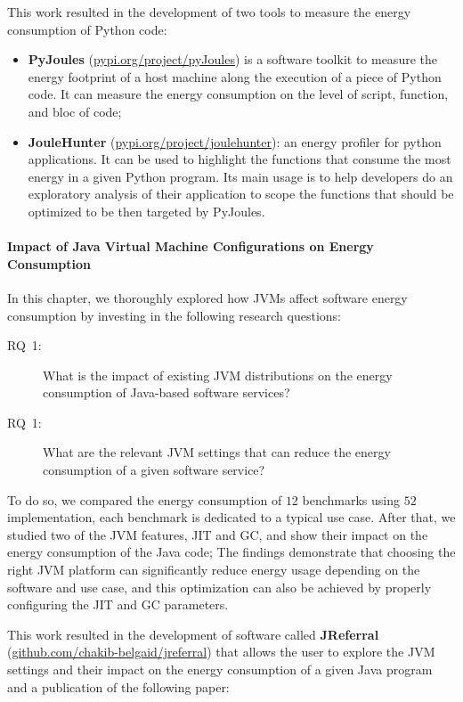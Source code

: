 This work resulted in the development of two tools to measure the energy consumption of Python code: 
\begin{itemize}
      \item \textbf{PyJoules} (\url{pypi.org/project/pyJoules}) is a software toolkit to measure the energy footprint of a host machine along the execution of a piece of Python code. It can measure the energy consumption on the level of script, function, and bloc of code;
      \item \textbf{JouleHunter} (\url{pypi.org/project/joulehunter}): an energy profiler for python applications. It can be used to highlight the functions that consume the most energy in a given Python program. Its main usage is to help developers do an exploratory analysis of their application to scope the functions that should be optimized to be then targeted by PyJoules.
     \end{itemize}


\paragraph*{Impact of Java Virtual Machine Configurations on Energy Consumption}

In this chapter, we thoroughly explored how JVMs affect software energy consumption by investing in the following research questions:
\begin{description}
      \item[\textsc{RQ}~1:] What is the impact of existing JVM distributions on the energy consumption of Java-based software services?
      \item [\textsc{RQ}~1:] What are the relevant JVM settings that can reduce the energy consumption of a given software service?
\end{description}
To do so, we compared the energy consumption of $12$ benchmarks using $52$ implementation, each benchmark is dedicated to a typical use case.
After that, we studied two of the JVM features, JIT and GC, and show their impact on the energy consumption of the Java code;
The findings demonstrate that choosing the right JVM platform can significantly reduce energy usage depending on the software and use case, and this optimization can also be achieved by properly configuring the JIT and GC parameters.

This work resulted in the development of software called \textbf{JReferral} (\url{github.com/chakib-belgaid/jreferral}) that allows the user to explore the JVM settings and their impact on the energy consumption of a given Java program and a publication of the following paper: 
\\

